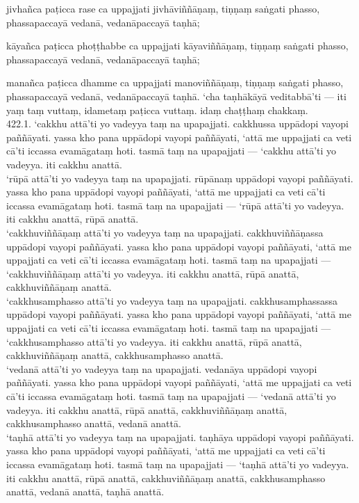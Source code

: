 \documentclass[10pt]{article}
\begin{document}
jivhañca paṭicca rase ca uppajjati jivhāviññāṇaṃ, tiṇṇaṃ saṅgati phasso, phassapaccayā vedanā, vedanāpaccayā taṇhā;\

kāyañca paṭicca phoṭṭhabbe ca uppajjati kāyaviññāṇaṃ, tiṇṇaṃ saṅgati phasso, phassapaccayā vedanā, vedanāpaccayā taṇhā;\

manañca paṭicca dhamme ca uppajjati manoviññāṇaṃ, tiṇṇaṃ saṅgati phasso, phassapaccayā vedanā, vedanāpaccayā taṇhā. ‘cha taṇhākāyā veditabbā’ti — iti yaṃ taṃ vuttaṃ, idametaṃ paṭicca vuttaṃ. idaṃ chaṭṭhaṃ chakkaṃ.\\

422.1. ‘cakkhu attā’ti yo vadeyya taṃ na upapajjati. cakkhussa uppādopi vayopi paññāyati. yassa kho pana uppādopi vayopi paññāyati, ‘attā me uppajjati ca veti cā’ti iccassa evamāgataṃ hoti. tasmā taṃ na upapajjati — ‘cakkhu attā’ti yo vadeyya. iti cakkhu anattā.\\

‘rūpā attā’ti yo vadeyya taṃ na upapajjati. rūpānaṃ uppādopi vayopi paññāyati. yassa kho pana uppādopi vayopi paññāyati, ‘attā me uppajjati ca veti cā’ti iccassa evamāgataṃ hoti. tasmā taṃ na upapajjati — ‘rūpā attā’ti yo vadeyya. iti cakkhu anattā, rūpā anattā.\\

‘cakkhuviññāṇaṃ attā’ti yo vadeyya taṃ na upapajjati. cakkhuviññāṇassa uppādopi vayopi paññāyati. yassa kho pana uppādopi vayopi paññāyati, ‘attā me uppajjati ca veti cā’ti iccassa evamāgataṃ hoti. tasmā taṃ na upapajjati — ‘cakkhuviññāṇaṃ attā’ti yo vadeyya. iti cakkhu anattā, rūpā anattā, cakkhuviññāṇaṃ anattā.\\

‘cakkhusamphasso attā’ti yo vadeyya taṃ na upapajjati. cakkhusamphassassa uppādopi vayopi paññāyati. yassa kho pana uppādopi vayopi paññāyati, ‘attā me uppajjati ca veti cā’ti iccassa evamāgataṃ hoti. tasmā taṃ na upapajjati — ‘cakkhusamphasso attā’ti yo vadeyya. iti cakkhu anattā, rūpā anattā, cakkhuviññāṇaṃ anattā, cakkhusamphasso anattā.\\

‘vedanā attā’ti yo vadeyya taṃ na upapajjati. vedanāya uppādopi vayopi paññāyati. yassa kho pana uppādopi vayopi paññāyati, ‘attā me uppajjati ca veti cā’ti iccassa evamāgataṃ hoti. tasmā taṃ na upapajjati — ‘vedanā attā’ti yo vadeyya. iti cakkhu anattā, rūpā anattā, cakkhuviññāṇaṃ anattā, cakkhusamphasso anattā, vedanā anattā.\\

‘taṇhā attā’ti yo vadeyya taṃ na upapajjati. taṇhāya uppādopi vayopi paññāyati. yassa kho pana uppādopi vayopi paññāyati, ‘attā me uppajjati ca veti cā’ti iccassa evamāgataṃ hoti. tasmā taṃ na upapajjati — ‘taṇhā attā’ti yo vadeyya. iti cakkhu anattā, rūpā anattā, cakkhuviññāṇaṃ anattā, cakkhusamphasso anattā, vedanā anattā, taṇhā anattā.\\
\end{document}

